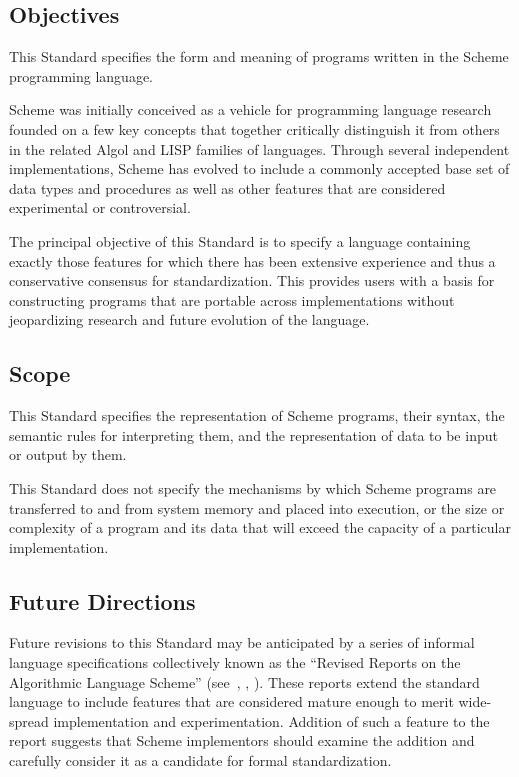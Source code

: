 
\subsection*{Objectives}


\vest This Standard specifies the form and meaning of programs written
in the Scheme programming language.

\vest Scheme was initially conceived as a vehicle for programming
language research founded on a few key concepts that together
critically distinguish it from others in the related Algol and LISP
families of languages.  Through several independent implementations,
Scheme has evolved to include a commonly accepted base
set of data types and procedures as well as other features that are
considered experimental or controversial.

\vest The principal objective of this Standard is to specify a
language containing exactly those features for which there has been
extensive experience and thus a conservative consensus for
standardization.  This provides users with a basis for constructing
programs that are portable across implementations without jeopardizing
research and future evolution of the language.


\subsection*{Scope}

\vest This Standard specifies the representation of Scheme programs,
their syntax, the semantic rules for interpreting them, and the
representation of data to be input or output by them.

\vest This Standard does not specify the mechanisms by which Scheme
programs are transferred to and from system memory and placed into
execution, or the size or complexity of a program and its data that
will exceed the capacity of a particular implementation.


\subsection*{Future Directions}

\vest Future revisions to this Standard may be anticipated by a series
of informal language specifications collectively known as the
``Revised Reports on the Algorithmic Language Scheme''
(see~\cite{RRRS}, \cite{R3RS}, \cite{R4RS}). These reports extend the
standard language to include features that are considered mature
enough to merit wide-spread implementation and experimentation.
Addition of such a feature to the report suggests that Scheme
implementors should examine the addition and carefully consider it as
a candidate for formal standardization.


